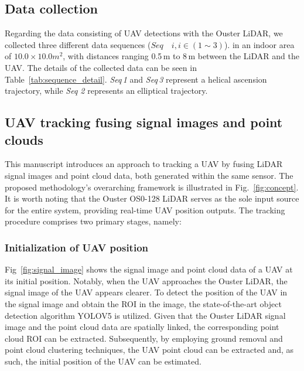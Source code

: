 
\subsection{Data collection}\label{subsec:data}

Regarding the data consisting of UAV detections with the Ouster LiDAR, we collected three different data sequences ($Seq \quad i, i \in (1 \sim 3)$).
in an indoor area of $10.0 \times 10.0 m^2$, with distances ranging 0.5\,m to 8\,m between the LiDAR and the UAV. The details of the collected data can be seen in Table~\ref{tab:sequence_detail}. \textit{Seq\,1} and \textit{Seq\,3} represent a helical ascension trajectory, while \textit{Seq 2} represents an elliptical trajectory. 
 



\subsection{UAV tracking fusing signal images and point clouds}

This manuscript introduces an approach to tracking a UAV by fusing LiDAR signal images and point cloud data, both generated within the same sensor. The proposed methodology's overarching framework is illustrated in Fig.~\ref{fig:concept}. It is worth noting that the Ouster OS0-128 LiDAR serves as the sole input source for the entire system, providing real-time UAV position outputs. The tracking procedure comprises two primary stages, namely:

\subsubsection{Initialization of UAV position}

Fig~\ref{fig:signal_image} shows the signal image and point cloud data of a UAV at its initial position. Notably, when the UAV approaches the Ouster LiDAR, the signal image of the UAV appears clearer. To detect the position of the UAV in the signal image and obtain the ROI in the image, the state-of-the-art object detection algorithm YOLOV5 is utilized. Given that the Ouster LiDAR signal image and the point cloud data are spatially linked, the corresponding point cloud ROI can be extracted. Subsequently, by employing ground removal and point cloud clustering techniques, the UAV point cloud can be extracted and, as such, the initial position of the UAV can be estimated.

